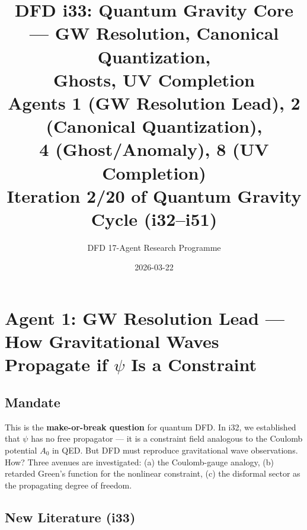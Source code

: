 \documentclass[11pt,a4paper]{article}
\title{DFD i33: Quantum Gravity Core --- GW Resolution, Canonical Quantization,\\Ghosts, UV Completion\\[6pt]
\large Agents 1 (GW Resolution Lead), 2 (Canonical Quantization),\\
4 (Ghost/Anomaly), 8 (UV Completion)\\[6pt]
\normalsize Iteration 2/20 of Quantum Gravity Cycle (i32--i51)}
\author{DFD 17-Agent Research Programme}
\date{2026-03-22}
\begin{document}
\maketitle
\tableofcontents
\newpage

\section{Agent 1: GW Resolution Lead --- How Gravitational Waves Propagate if $\psi$ Is a Constraint}
\label{sec:agent1}

\subsection{Mandate}

This is the \textbf{make-or-break question} for quantum DFD. In i32, we established that $\psi$ has no free propagator --- it is a constraint field analogous to the Coulomb potential $A_0$ in QED. But DFD must reproduce gravitational wave observations. How? Three avenues are investigated: (a) the Coulomb-gauge analogy, (b) retarded Green's function for the nonlinear constraint, (c) the disformal sector as the propagating degree of freedom.

\subsection{New Literature (i33)}
\end{document}
